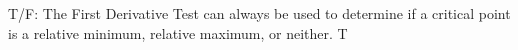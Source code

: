 {T/F: The First Derivative Test can always be used to determine if a critical point is a relative minimum, relative maximum, or neither.
}
{T
}
